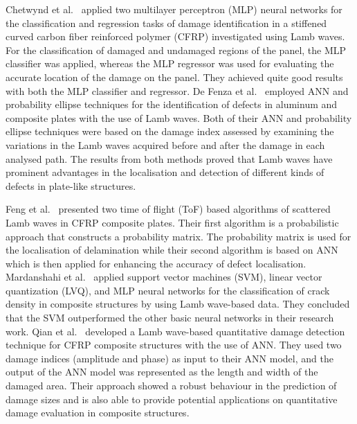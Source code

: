 Chetwynd et al.~\cite{chetwynd2008damage} applied two multilayer perceptron (MLP) 
neural networks for the classification and regression tasks of
damage identification in a stiffened curved carbon fiber reinforced polymer (CFRP) investigated using Lamb waves.
For the classification of damaged and undamaged regions of the panel, the MLP classifier was applied, whereas the MLP regressor was used for evaluating the accurate location of the damage on the panel. 
They achieved quite good results with both the MLP classifier and regressor.
De Fenza et al.~\cite{de2015application} employed ANN and probability ellipse 
techniques for the identification of defects in aluminum and composite plates 
with the use of Lamb waves.
Both of their ANN and probability ellipse techniques were based on the damage index assessed by examining the variations in the Lamb waves acquired before and after the damage in each analysed path.
The results from both methods proved that Lamb waves have prominent advantages in the localisation and detection of different kinds of defects in plate-like structures. 

Feng et al.~\cite{feng2019locating} presented two time of flight (ToF) based algorithms of scattered Lamb waves in CFRP composite plates.
Their first algorithm is a probabilistic approach that constructs a probability
matrix. 
The probability matrix is used for the localisation of delamination while
their second algorithm is based on ANN which is then applied for enhancing
the accuracy of defect localisation.
Mardanshahi et al.~\cite{mardanshahi2020detection} applied support vector machines (SVM), linear vector quantization (LVQ), and MLP neural networks for the classification of crack density in composite structures by using Lamb wave-based data.
They concluded that the SVM outperformed the other basic neural networks in
their research work.
Qian et al.~\cite{qian2020application} developed a Lamb wave-based quantitative damage detection technique for CFRP composite structures with the use of ANN.  
They used two damage indices (amplitude and phase) as input to their ANN model, and the output of the ANN model was represented as the length and width of the damaged area.  
Their approach showed a robust behaviour in the prediction of damage sizes and is also able to provide potential applications on quantitative damage evaluation in composite structures.  

